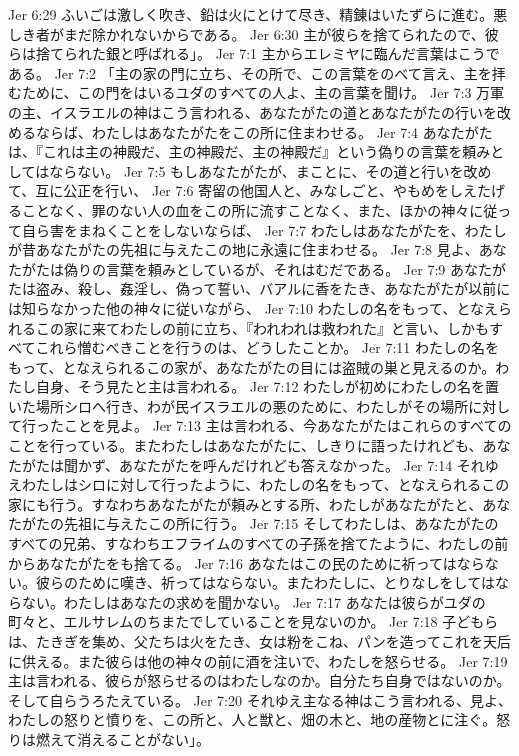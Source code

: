 Jer 6:29  ふいごは激しく吹き、鉛は火にとけて尽き、精錬はいたずらに進む。悪しき者がまだ除かれないからである。
Jer 6:30  主が彼らを捨てられたので、彼らは捨てられた銀と呼ばれる」。
Jer 7:1  主からエレミヤに臨んだ言葉はこうである。
Jer 7:2  「主の家の門に立ち、その所で、この言葉をのべて言え、主を拝むために、この門をはいるユダのすべての人よ、主の言葉を聞け。
Jer 7:3  万軍の主、イスラエルの神はこう言われる、あなたがたの道とあなたがたの行いを改めるならば、わたしはあなたがたをこの所に住まわせる。
Jer 7:4  あなたがたは、『これは主の神殿だ、主の神殿だ、主の神殿だ』という偽りの言葉を頼みとしてはならない。
Jer 7:5  もしあなたがたが、まことに、その道と行いを改めて、互に公正を行い、
Jer 7:6  寄留の他国人と、みなしごと、やもめをしえたげることなく、罪のない人の血をこの所に流すことなく、また、ほかの神々に従って自ら害をまねくことをしないならば、
Jer 7:7  わたしはあなたがたを、わたしが昔あなたがたの先祖に与えたこの地に永遠に住まわせる。
Jer 7:8  見よ、あなたがたは偽りの言葉を頼みとしているが、それはむだである。
Jer 7:9  あなたがたは盗み、殺し、姦淫し、偽って誓い、バアルに香をたき、あなたがたが以前には知らなかった他の神々に従いながら、
Jer 7:10  わたしの名をもって、となえられるこの家に来てわたしの前に立ち、『われわれは救われた』と言い、しかもすべてこれら憎むべきことを行うのは、どうしたことか。
Jer 7:11  わたしの名をもって、となえられるこの家が、あなたがたの目には盗賊の巣と見えるのか。わたし自身、そう見たと主は言われる。
Jer 7:12  わたしが初めにわたしの名を置いた場所シロへ行き、わが民イスラエルの悪のために、わたしがその場所に対して行ったことを見よ。
Jer 7:13  主は言われる、今あなたがたはこれらのすべてのことを行っている。またわたしはあなたがたに、しきりに語ったけれども、あなたがたは聞かず、あなたがたを呼んだけれども答えなかった。
Jer 7:14  それゆえわたしはシロに対して行ったように、わたしの名をもって、となえられるこの家にも行う。すなわちあなたがたが頼みとする所、わたしがあなたがたと、あなたがたの先祖に与えたこの所に行う。
Jer 7:15  そしてわたしは、あなたがたのすべての兄弟、すなわちエフライムのすべての子孫を捨てたように、わたしの前からあなたがたをも捨てる。
Jer 7:16  あなたはこの民のために祈ってはならない。彼らのために嘆き、祈ってはならない。またわたしに、とりなしをしてはならない。わたしはあなたの求めを聞かない。
Jer 7:17  あなたは彼らがユダの町々と、エルサレムのちまたでしていることを見ないのか。
Jer 7:18  子どもらは、たきぎを集め、父たちは火をたき、女は粉をこね、パンを造ってこれを天后に供える。また彼らは他の神々の前に酒を注いで、わたしを怒らせる。
Jer 7:19  主は言われる、彼らが怒らせるのはわたしなのか。自分たち自身ではないのか。そして自らうろたえている。
Jer 7:20  それゆえ主なる神はこう言われる、見よ、わたしの怒りと憤りを、この所と、人と獣と、畑の木と、地の産物とに注ぐ。怒りは燃えて消えることがない」。
